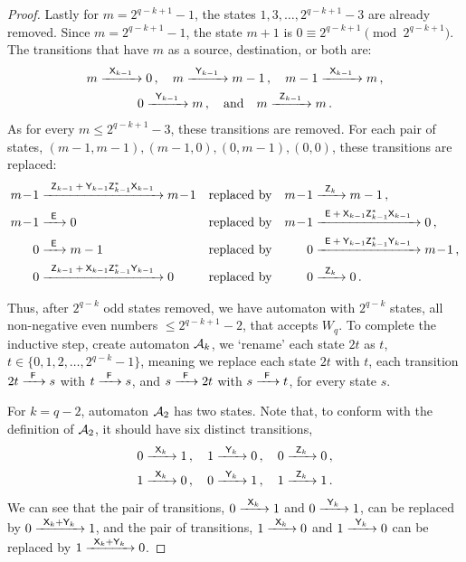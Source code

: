 \begin{proof}
    Lastly for $m = 2^{q-k+1}-1$,  the states $1, 3, \dotsc, 2^{q-k+1}-3$ are already removed. Since $m = 2^{q-k+1}-1$, the state $m+1$ is $0 \equiv 2^{q-k+1} \pmod{2^{q-k+1}}$. The transitions that have $m$ as a source, destination, or both are:
    \begin{multline*}
        m {\; \xrightarrow[]{\: \; {\mathsf{X}}_{k-1} \: \;} \;} 0 \, , \quad m {\; \xrightarrow[]{\: \; {\mathsf{Y}}_{k-1} \: \;} \;} m-1 \, , \quad m-1 {\; \xrightarrow[]{\: \; {\mathsf{X}}_{k-1} \: \;} \;} m \, , \\
        0 {\; \xrightarrow[]{\: \; {\mathsf{Y}}_{k-1} \: \;} \;} m \, , \quad \text{and} \quad m {\; \xrightarrow[]{\: \; {\mathsf{Z}}_{k-1} \: \;} \;} m \, .
    \end{multline*}
    As for every $m \leq 2^{q-k+1}-3$, these transitions are removed. For each pair of states, $(m-1,m-1), (m-1,0), (0,m-1), (0,0)$, these transitions are replaced:
    \begin{align*}
        m \! - \! 1 &\tr{\re{Z}_{k-1} \: + \: \re{Y}_{k-1}\re{Z}_{k-1}^*\re{X}_{k-1}} m \! - \! 1 & &\text{replaced by} & m \! - \! 1 &\tr{\re{Z}_k} m-1 \, , \\
        m \! - \! 1 &\tr{\re{E}} 0 & &\text{replaced by} & m \! - \! 1 &\tr{\re{E} \: + \: \re{X}_{k-1}\re{Z}_{k-1}^*\re{X}_{k-1}} 0 \, , \\
        0 &\tr{\re{E}} m-1 & &\text{replaced by} & 0 &\tr{\re{E} \: + \: \re{Y}_{k-1}\re{Z}_{k-1}^*\re{Y}_{k-1}} m \! - \! 1 \, , \\
        0 &\tr{\re{Z}_{k-1} \: + \: \re{X}_{k-1}\re{Z}_{k-1}^*\re{Y}_{k-1}} 0 & &\text{replaced by} & 0 &\tr{\re{Z}_k} 0 \, .
    \end{align*}

    Thus, after $2^{q-k}$ odd states removed, we have automaton with $2^{q-k}$ states, all non-negative even numbers $\leq 2^{q-k+1}-2$, that accepts $W_q$. To complete the inductive step, create automaton ${\mathcal{A}}_k$, we `rename' each state $2t$ as $t$, $t \in \{ 0, 1, 2, \dotsc, 2^{q-k}-1 \}$, meaning we replace each state $2t$ with $t$, each transition $2t {\; \xrightarrow[]{\: \; {\mathsf{F}} \: \;} \;} s$ with $t {\; \xrightarrow[]{\: \; {\mathsf{F}} \: \;} \;} s$, and $s {\; \xrightarrow[]{\: \; {\mathsf{F}} \: \;} \;} 2t$ with $s {\; \xrightarrow[]{\: \; {\mathsf{F}} \: \;} \;} t$, for every state $s$.

    For $k = q-2$, automaton ${\mathcal{A}}_2$ has two states. Note that, to conform with the definition of ${\mathcal{A}}_2$, it should have six distinct transitions,
    \begin{align*}
        0 {\; \xrightarrow[]{\: \; {\mathsf{X}}_k \: \;} \;} 1 \, , \quad 1 {\; \xrightarrow[]{\: \; {\mathsf{Y}}_k \: \;} \;} 0 \, , \quad 0 {\; \xrightarrow[]{\: \; {\mathsf{Z}}_k \: \;} \;} 0 \, , \\
        1 {\; \xrightarrow[]{\: \; {\mathsf{X}}_k \: \;} \;} 0 \, , \quad 0 {\; \xrightarrow[]{\: \; {\mathsf{Y}}_k \: \;} \;} 1 \, , \quad 1 {\; \xrightarrow[]{\: \; {\mathsf{Z}}_k \: \;} \;} 1 \, .
    \end{align*}
    We can see that the pair of transitions, $0 {\; \xrightarrow[]{\: \; {\mathsf{X}}_k \: \;} \;} 1$ and $0 {\; \xrightarrow[]{\: \; {\mathsf{Y}}_k \: \;} \;} 1$, can be replaced by $0 {\; \xrightarrow[]{\: \; {\mathsf{X}}_k + {\mathsf{Y}}_k \: \;} \;} 1$, and the pair of transitions, $1 {\; \xrightarrow[]{\: \; {\mathsf{X}}_k \: \;} \;} 0$ and $1 {\; \xrightarrow[]{\: \; {\mathsf{Y}}_k \: \;} \;} 0$ can be replaced by $1 {\; \xrightarrow[]{\: \; {\mathsf{X}}_k + {\mathsf{Y}}_k \: \;} \;} 0$.


\end{proof}
